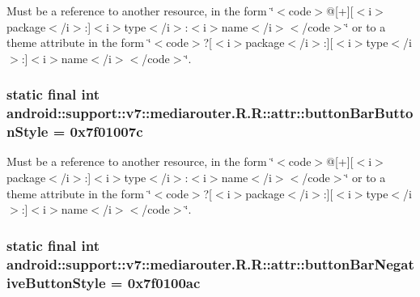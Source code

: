 Must be a reference to another resource, in the form \char`\"{}$<$code$>$@\mbox{[}+\mbox{]}\mbox{[}$<$i$>$package$<$/i$>$:\mbox{]}$<$i$>$type$<$/i$>$:$<$i$>$name$<$/i$>$$<$/code$>$\char`\"{} or to a theme attribute in the form \char`\"{}$<$code$>$?\mbox{[}$<$i$>$package$<$/i$>$:\mbox{]}\mbox{[}$<$i$>$type$<$/i$>$:\mbox{]}$<$i$>$name$<$/i$>$$<$/code$>$\char`\"{}. \hypertarget{classandroid_1_1support_1_1v7_1_1mediarouter_1_1_r_1_1attr_a13c444edd871d88964bb4a4b0e117fd}{
\subsubsection[{buttonBarButtonStyle}]{\setlength{\rightskip}{0pt plus 5cm}static final int android::support::v7::mediarouter.R.R::attr::buttonBarButtonStyle = 0x7f01007c}}
\label{classandroid_1_1support_1_1v7_1_1mediarouter_1_1_r_1_1attr_a13c444edd871d88964bb4a4b0e117fd}


Must be a reference to another resource, in the form \char`\"{}$<$code$>$@\mbox{[}+\mbox{]}\mbox{[}$<$i$>$package$<$/i$>$:\mbox{]}$<$i$>$type$<$/i$>$:$<$i$>$name$<$/i$>$$<$/code$>$\char`\"{} or to a theme attribute in the form \char`\"{}$<$code$>$?\mbox{[}$<$i$>$package$<$/i$>$:\mbox{]}\mbox{[}$<$i$>$type$<$/i$>$:\mbox{]}$<$i$>$name$<$/i$>$$<$/code$>$\char`\"{}. \hypertarget{classandroid_1_1support_1_1v7_1_1mediarouter_1_1_r_1_1attr_6efe909fb8c6b26f612f3303b57e2279}{
\subsubsection[{buttonBarNegativeButtonStyle}]{\setlength{\rightskip}{0pt plus 5cm}static final int android::support::v7::mediarouter.R.R::attr::buttonBarNegativeButtonStyle = 0x7f0100ac}}
\label{classandroid_1_1support_1_1v7_1_1mediarouter_1_1_r_1_1attr_6efe909fb8c6b26f612f3303b57e2279}


